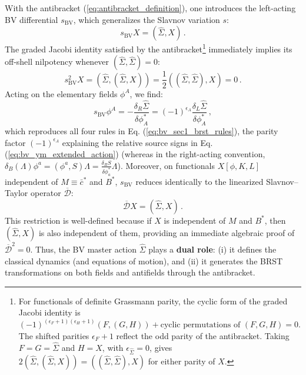 With the antibracket (\ref{eq:antibracket_definition}), one introduces the left-acting BV differential \(s_{\text{BV}}\), which generalizes the Slavnov variation \(s\):
\begin{equation} \label{eq:s_bv_definition}
    s_{\text{BV}} X = (\widehat{\Sigma}, X) \, .
\end{equation}
The graded Jacobi identity satisfied by the antibracket\footnote{For functionals of definite Grassmann parity, the cyclic form of the graded Jacobi identity is \((-1)^{(\epsilon_F + 1)(\epsilon_H + 1)} (F, (G, H)) + \text{cyclic permutations of } (F, G, H) = 0\). The shifted parities \(\epsilon_F + 1\) reflect the odd parity of the antibracket. Taking \(F = G = \widehat{\Sigma}\) and \(H = X\), with \(\epsilon_{\widehat{\Sigma}} = 0\), gives \(2(\widehat{\Sigma}, (\widehat{\Sigma}, X)) = ((\widehat{\Sigma}, \widehat{\Sigma}), X)\) for either parity of \(X\).} immediately implies its off-shell nilpotency whenever \((\widehat{\Sigma}, \widehat{\Sigma}) = 0\):
\begin{equation} \label{eq:s_bv_nilpotency}
    s_{\text{BV}}^2 X = (\widehat{\Sigma}, (\widehat{\Sigma}, X)) = \frac{1}{2}((\widehat{\Sigma}, \widehat{\Sigma}), X) = 0 \, .
\end{equation}
Acting on the elementary fields \(\phi^A\), we find:
\begin{equation} \label{eq:s_bv_on_fields}
    s_{\text{BV}} \phi^A = -\frac{\delta_R \widehat{\Sigma}}{\delta \phi_A^*} = (-1)^{\epsilon_A} \frac{\delta_L \widehat{\Sigma}}{\delta \phi_A^*} \, ,
\end{equation}
which reproduces all four rules in Eq. (\ref{eq:bv_sec1_brst_rules}), the parity factor \((-1)^{\epsilon_A}\) explaining the relative source signs in Eq. (\ref{eq:bv_ym_extended_action}) (whereas in the right-acting convention, \(\delta_B(\Lambda)\phi^a = (\phi^a, S)\Lambda = \frac{\delta_R S}{\delta \phi_a^*}\Lambda\)). Moreover, on functionals \(X[\phi, K, L]\) independent of \(M \equiv \bar{c}^*\) and \(B^*\), \(s_{\text{BV}}\) reduces identically to the linearized Slavnov--Taylor operator \(\overline{\mathcal{D}}\):
\begin{equation} \label{eq:s_bv_reduces_to_dbar}
    \overline{\mathcal{D}} X = (\widehat{\Sigma}, X) \, .
\end{equation}
This restriction is well-defined because if \(X\) is independent of \(M\) and \(B^*\), then \((\widehat{\Sigma}, X)\) is also independent of them, providing an immediate algebraic proof of \(\overline{\mathcal{D}}^2 = 0\). Thus, the BV master action \(\widehat{\Sigma}\) plays a \textbf{dual role}: (i) it defines the classical dynamics (and equations of motion), and (ii) it generates the BRST transformations on both fields and antifields through the antibracket.

